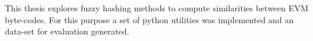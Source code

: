
This thesis explores fuzzy hashing methods to compute similarities between EVM byte-codes.
For this purpose a set of python utilities was implemented and an data-set for evaluation generated.
